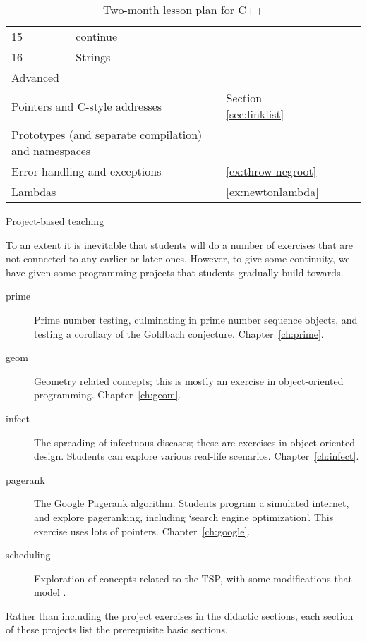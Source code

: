 \begin{table}[ht]
\begin{tabular}{|l|p{\colwidth}|p{\colwidth}p{\colwidth}p{\colwidth}p{\colwidth}|}
    15 & continue
        &&&&\\
    16 & Strings
        &&&&\\
    \hline
    \multicolumn{2}{|p{2in}|}{Advanced}\\
    \hline
    \multicolumn{2}{|p{2in}|}{Pointers and C-style addresses}
        &Section \ref{sec:linklist}&&&\\
    \multicolumn{2}{|p{2in}|}{Prototypes (and separate compilation)
      and namespaces}
        &&&&\\
    \multicolumn{2}{|p{2in}|}{Error handling and exceptions}
        &\ref{ex:throw-negroot}&&&\\
    \multicolumn{2}{|p{2in}|}{Lambdas}
        &\ref{ex:newtonlambda}&&&\\
    \hline
  \end{tabular}
  \caption{Two-month lesson plan for C++}
  \label{tab:c++plan}
\end{table}

 {Project-based teaching}

To an extent it is inevitable that students will do a number of
exercises that are not connected to any earlier or later ones.
However, to give some continuity, we have given some programming
projects that students gradually build towards.

\begin{description}
\item[prime] Prime number testing, culminating in prime number
  sequence objects, and testing a corollary of the Goldbach
  conjecture. Chapter~\ref{ch:prime}.
\item[geom] Geometry related concepts; this is mostly an exercise in
  object-oriented programming. Chapter~\ref{ch:geom}.
\item[infect] The spreading of infectuous diseases; these are
  exercises in object-oriented design. Students can explore various
  real-life scenarios. Chapter~\ref{ch:infect}.
\item[pagerank] The Google Pagerank algorithm. Students program a
  simulated internet, and explore pageranking, including `search
  engine optimization'. This exercise uses lots of
  pointers. Chapter~\ref{ch:google}.
\item[scheduling] Exploration of concepts related to the
  \ac{TSP}, with some modifications that
  model .
\end{description}

Rather than including the project exercises in the didactic sections,
each section of these projects list the prerequisite basic sections.

